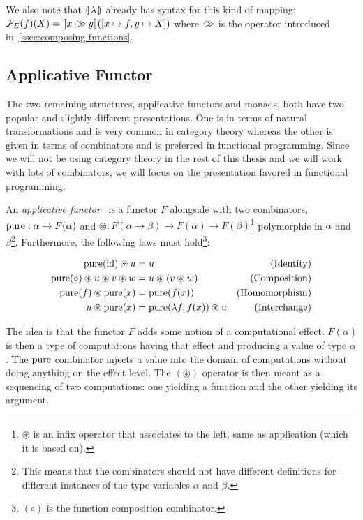 We also note that $\llparenthesis \, \lambda \, \rrparenthesis$ already has syntax for this kind of
mapping: $\mathcal{F}_E(f)(X) = \llbracket x \mathbin{\cdot\!\!\gg} y \rrbracket([x \mapsto f, y \mapsto X])$ where
$\mathbin{\cdot\!\!\gg}$ is the operator introduced in~\ref{ssec:composing-functions}.


\subsection{Applicative Functor}
\label{ssec:applicative-functor}

The two remaining structures, applicative functors and monads, both have
two popular and slightly different presentations. One is in terms of
natural transformations and is very common in category theory whereas the
other is given in terms of combinators and is preferred in functional
programming. Since we will not be using category theory in the rest of this
thesis and we will work with lots of combinators, we will focus on the
presentation favored in functional programming.

\begin{definition}
  An \emph{applicative functor}~\cite{mcbride2008applicative} is a functor
  $F$ alongside with two combinators, $\operatorname{pure} : \alpha \to F(\alpha)$ and
  $\circledast : F(\alpha \to \beta) \to F(\alpha) \to
  F(\beta)$\footnote{$\circledast$ is an infix operator that associates to
    the left, same as application (which it is based on).}  polymorphic in
  $\alpha$ and $\beta$\footnote{This means that the combinators should not
    have different definitions for different instances of the type
    variables $\alpha$ and $\beta$.}. Furthermore, the following laws must
  hold\footnote{$(\circ)$ is the function composition combinator.}:

  \begin{align}
    \label{law:app-identity}\operatorname{pure}(\mathrm{id}) \circledast u &= u & \text{(Identity)} \\
    \label{law:app-composition}\operatorname{pure}(\circ) \circledast u \circledast v \circledast w &= u \circledast (v \circledast w) & \text{(Composition)} \\
    \label{law:app-homomorphism}\operatorname{pure}(f) \circledast \operatorname{pure}(x) &= \operatorname{pure}(f(x)) & \text{(Homomorphism)} \\
    \label{law:app-interchange}u \circledast \operatorname{pure}(x) &= \operatorname{pure}(\lambda f.\, f(x)) \circledast u & \text{(Interchange)}
  \end{align}
\end{definition}

The idea is that the functor $F$ adds some notion of a computational
effect. $F(\alpha)$ is then a type of computations having that effect and
producing a value of type $\alpha$. The $\operatorname{pure}$ combinator injects a value
into the domain of computations without doing anything on the effect
level. The $(\circledast)$ operator is then meant as a sequencing of two
computations: one yielding a function and the other yielding its argument.

